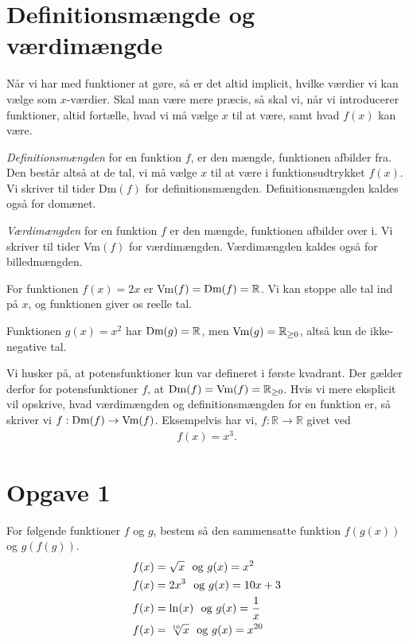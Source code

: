 \section*{Definitionsmængde og værdimængde}
Når vi har med funktioner at gøre, så er det altid implicit, hvilke værdier vi kan vælge som $x$-værdier. Skal man være mere præcis, så skal vi, når vi introducerer funktioner, altid fortælle, hvad vi må vælge $x$ til at være, samt hvad $f(x)$ kan være. 
\begin{defn}[Definitionsmængde]
\textit{Definitionsmængden} for en funktion $f$, er den mængde, funktionen afbilder fra. Den består altså at de tal, vi må vælge $x$ til at være i funktionsudtrykket $f(x)$. Vi skriver til tider Dm$(f)$ for definitionsmængden. Definitionsmængden kaldes også for domænet.
\end{defn}
\begin{defn}[Værdimængde]
\textit{Værdimængden} for en funktion $f$ er den mængde, funktionen afbilder over i. Vi skriver til tider Vm$(f)$ for værdimængden. Værdimængden kaldes også for billedmængden.
\end{defn}
\begin{exa}
For funktionen $f(x) = 2x$ er Vm$(f) = \textnormal{Dm}(f) = \mathbb{R}$. Vi kan stoppe alle tal ind på $x$, og funktionen giver os reelle tal.  
\end{exa}
\begin{exa}
Funktionen $g(x) = x^2$ har $\textnormal{Dm}(g) = \mathbb{R}$, men $\textnormal{Vm}(g) = \mathbb{R}_{\geq 0}$, altså kun de ikke-negative tal.
\end{exa}
Vi husker på, at potensfunktioner kun var defineret i første kvadrant. Der gælder derfor for potensfunktioner $f$, at $\textnormal{Dm}(f) = \textnormal{Vm}(f) = \mathbb{R}_{\geq 0}$. Hvis vi mere eksplicit vil opskrive, hvad værdimængden og definitionsmængden for en funktion er, så skriver vi $f: \textnormal{Dm}(f) \to \textnormal{Vm}(f)$. Eksempelvis har vi, $f:\mathbb{R} \to \mathbb{R}$ givet ved 
\begin{align*}
f(x) = x^3.
\end{align*}
\section*{Opgave 1}
For følgende funktioner $f$ og $g$, bestem så den sammensatte funktion $f(g(x))$ og $g(f(g))$.
\begin{align*}
&f(x) = \sqrt{x}\  \textnormal{ og } g(x) = x^2\\
&f(x) = 2x^3\  \textnormal{ og } g(x) = 10x+3\\
&f(x) = \ln(x)\  \textnormal{ og } g(x) = \frac{1}{x}\\
&f(x) = \sqrt[10]{x}\  \textnormal{ og } g(x) = x^{20}
\end{align*}
